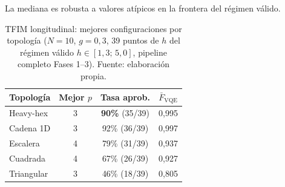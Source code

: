 \documentclass[11pt,a4paper,spanish]{book}
\begin{document}
La mediana es robusta a valores atípicos en la frontera del régimen válido.

\begin{table}[h]
\centering
\caption[TFIM longitudinal: mejores configuraciones por topología]{TFIM longitudinal: mejores configuraciones por topología ($N = 10$, $g = 0,3$, 39 puntos de $h$ del régimen válido $h \in [1{,}3;\, 5{,}0]$, pipeline completo Fases 1--3). Fuente: elaboración propia.}
\label{tab:tfim_long_deploy}
\begin{tabular}{lccc}
\toprule
\textbf{Topología} & \textbf{Mejor $p$} & \textbf{Tasa aprob.} & \textbf{$\bar{F}_{\text{VQE}}$} \\
\midrule
Heavy-hex & 3 & \textbf{90\%} (35/39) & 0,995 \\
Cadena 1D & 3 & 92\% (36/39) & 0,997 \\
Escalera & 4 & 79\% (31/39) & 0,937 \\
Cuadrada & 4 & 67\% (26/39) & 0,927 \\
Triangular & 3 & 46\% (18/39) & 0,805 \\
\bottomrule
\end{tabular}
\end{table}
\end{document}
